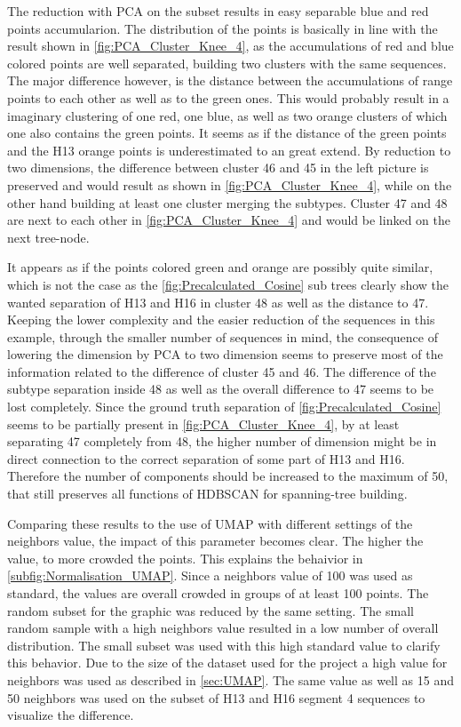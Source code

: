 The reduction with \gls{PCA} on the subset results in easy separable blue and red points accumularion. The distribution of the points is basically in line with the result shown in \autoref{fig:PCA_Cluster_Knee_4}, as the accumulations of red and blue colored points are well separated, building two clusters with the same sequences. The major difference however, is the distance between the accumulations of range points to each other as well as to the green ones. This would probably result in a imaginary clustering of one red, one blue, as well as two orange clusters of which one also contains the green points. It seems as if the distance of the green points and the H13 orange points is underestimated to an great extend. By reduction to two dimensions, the difference between cluster 46 and 45 in the left picture is preserved and would result as shown in \autoref{fig:PCA_Cluster_Knee_4}, while on the other hand building at least one cluster merging the subtypes. Cluster 47 and 48 are next to each other in \autoref{fig:PCA_Cluster_Knee_4} and would be linked on the next tree-node.

It appears as if the points colored green and orange are possibly quite similar, which is not the case as the \autoref{fig:Precalculated_Cosine} sub trees clearly show the wanted separation of H13 and H16 in cluster 48 as well as the distance to 47. Keeping the lower complexity and the easier reduction of the sequences in this example, through the smaller number of sequences in mind, the consequence of lowering the dimension by \gls{PCA} to two dimension seems to preserve most of the information related to the difference of cluster 45 and 46. The difference of the subtype separation inside 48 as well as the overall difference to 47 seems to be lost completely. Since the ground truth separation of \autoref{fig:Precalculated_Cosine} seems to be partially present in \autoref{fig:PCA_Cluster_Knee_4}, by at least separating 47 completely from 48, the higher number of dimension might be in direct connection to the correct separation of some part of H13 and H16. Therefore the number of components should be increased to the maximum of 50, that still preserves all functions of \gls{HDBSCAN} for spanning-tree building. 

Comparing these results to the use of \gls{UMAP} with different settings of the neighbors value, the impact of this parameter becomes clear. The higher the value, to more crowded the points. This explains the behaivior in \autoref{subfig:Normalisation_UMAP}. Since a neighbors value of 100 was used as standard, the values are overall crowded in groups of at least 100 points. The random subset for the graphic was reduced by the same setting. The small random sample with a high neighbors value resulted in a low number of overall distribution. The small subset was used with this high standard value to clarify this behavior. Due to the size of the dataset used for the project a high value for neighbors was used as described in \autoref{sec:UMAP}. The same value as well as 15 and 50 neighbors was used on the subset of H13 and H16 segment 4 sequences to visualize the difference. 

